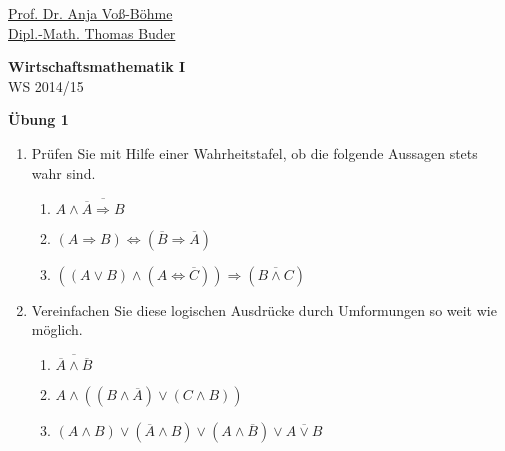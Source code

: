 \documentclass[12pt,a4paper]{scrreprt}
\begin{document}
 
\begin{flushleft}
\href{mailto:anja.voss-boehme@htw-dresden.de}{Prof. Dr. Anja Voß-Böhme} \\
\href{mailto:buder@htw-dresden.de}{Dipl.-Math. Thomas Buder}
\end{flushleft}

\begin{center}
\large{\textbf{ Wirtschaftsmathematik I}} \\
WS 2014/15 \end{center}

\begin{center}\large{\textbf{ Übung 1 }} \end{center}

\bigskip
\begin{enumerate}

 	\item 	Prüfen Sie mit Hilfe einer Wahrheitstafel, ob die folgende Aussagen stets wahr sind.

	\begin{enumerate}
	 	\item   $A \wedge \overline{\overline{A} \Rightarrow B} $
\begin{comment}
\begin{tabular}{lllll}
$A$ & $B$ & $\overline{A}$ & $\overline{\overline{A} \Rightarrow B}$ & $A \wedge \overline{\overline{A} \Rightarrow B}$ \\
1 & 1 & 0 & 	\\
1 & 0 & 0 & 	\\
0 & 1 & 1 & 	\\
0 & 0 & 1 & 
\end{tabular}
\end{comment}

		\item   $(A \Rightarrow B) \Leftrightarrow ( \overline{B} \Rightarrow \overline{A}) $
		\item   $\left( (A \vee B) \wedge ( A \Leftrightarrow \overline{C})\right)  \Rightarrow ( \overline{B \wedge C}) $
	\end{enumerate}

	\item Vereinfachen Sie diese logischen Ausdrücke durch Umformungen so weit wie möglich.
	
	\begin{enumerate}
		\item   $\overline{ \overline{A} \wedge \overline{B}}$
	 	\item   $A \wedge \left( ( B \wedge \overline{A} ) \vee (C \wedge B) \right) $
		\item $(A \wedge B) \vee (\overline{A} \wedge B) \vee (A \wedge \overline{B}) \vee \overline{ A \vee  B}$
	\end{enumerate}
	

\end{enumerate}
\end{document}
